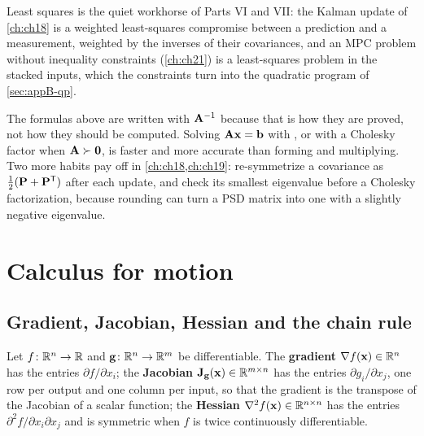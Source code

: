 Least squares is the quiet workhorse of Parts VI and VII: the Kalman update
of \cref{ch:ch18} is a weighted least-squares compromise between a prediction
and a measurement, weighted by the inverses of their covariances, and an MPC
problem without inequality constraints (\cref{ch:ch21}) is a least-squares
problem in the stacked inputs, which the constraints turn into the quadratic
program of \cref{sec:appB-qp}.

\begin{pitfall}
The formulas above are written with $\mathbf{A}^{-1}$ because that is how they are proved, not how they should be computed. Solving $\mathbf{A}\mathbf{x} = \mathbf{b}$ with , or with a Cholesky factor when $\mathbf{A} \succ \mathbf{0}$, is faster and more accurate than forming  and multiplying. Two more habits pay off in \cref{ch:ch18,ch:ch19}: re-symmetrize a covariance as $\tfrac12(\mathbf{P} + \mathbf{P}^{\mathsf{T}})$ after each update, and check its smallest eigenvalue before a Cholesky factorization, because rounding can turn a PSD matrix into one with a slightly negative eigenvalue.
\end{pitfall}

\section{Calculus for motion}
\label{sec:appB-calculus}

\subsection{Gradient, Jacobian, Hessian and the chain rule}

\begin{definition}
\label{def:appB-gradient}
Let $f\colon \mathbb{R}^n \to \mathbb{R}$ and $\mathbf{g}\colon \mathbb{R}^n \to \mathbb{R}^m$ be differentiable. The \textbf{gradient} $\nabla f(\mathbf{x}) \in \mathbb{R}^n$ has the entries $\partial f/\partial x_i$; the \textbf{Jacobian} $\mathbf{J}_{\mathbf{g}}(\mathbf{x}) \in \mathbb{R}^{m \times n}$ has the entries $\partial g_i/\partial x_j$, one row per output and one column per input, so that the gradient is the transpose of the Jacobian of a scalar function; the \textbf{Hessian} $\nabla^2 f(\mathbf{x}) \in \mathbb{R}^{n \times n}$ has the entries $\partial^2 f/\partial x_i \partial x_j$ and is symmetric when $f$ is twice continuously differentiable.
\end{definition}

